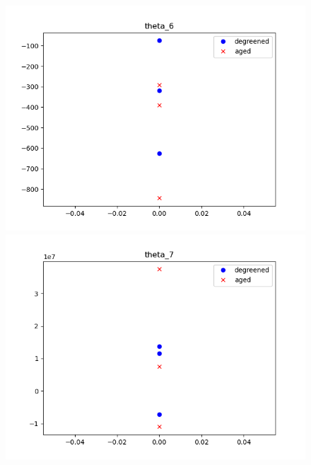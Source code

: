 \begin{figure}[H]
        \begin{minipage}{0.33\textwidth}
                \includegraphics[width = \textwidth]{./figs/figs_new_mdl/theta_6.png}
        \end{minipage}
        \begin{minipage}{0.33\textwidth}
                \includegraphics[width = \textwidth]{./figs/figs_new_mdl/theta_7.png}
        \end{minipage}
        \begin{minipage}{0.33\textwidth}

\end{minipage}
\end{figure}
